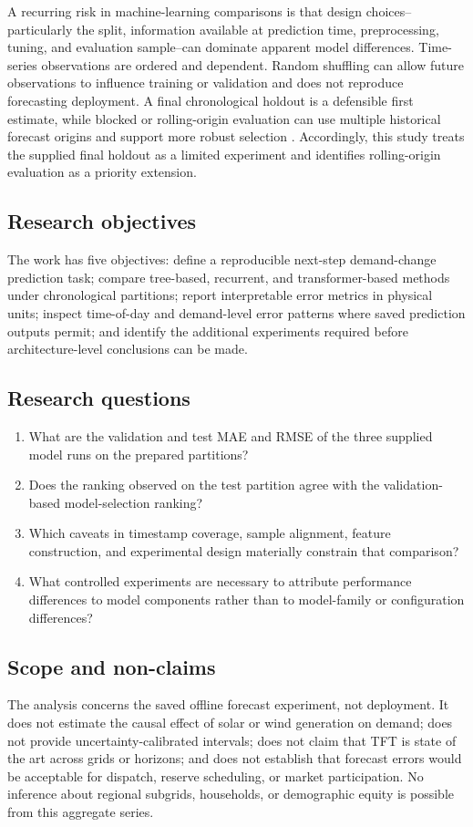 \documentclass[12pt,a4paper]{article}
\begin{document}
A recurring risk in machine-learning comparisons is that design choices--particularly the split, information available at prediction time, preprocessing, tuning, and evaluation sample--can dominate apparent model differences. Time-series observations are ordered and dependent. Random shuffling can allow future observations to influence training or validation and does not reproduce forecasting deployment. A final chronological holdout is a defensible first estimate, while blocked or rolling-origin evaluation can use multiple historical forecast origins and support more robust selection \cite{bergmeir2012}. Accordingly, this study treats the supplied final holdout as a limited experiment and identifies rolling-origin evaluation as a priority extension.

\subsection{Research objectives}
The work has five objectives: define a reproducible next-step demand-change prediction task; compare tree-based, recurrent, and transformer-based methods under chronological partitions; report interpretable error metrics in physical units; inspect time-of-day and demand-level error patterns where saved prediction outputs permit; and identify the additional experiments required before architecture-level conclusions can be made.

\subsection{Research questions}
\begin{enumerate}[leftmargin=*]
\item What are the validation and test MAE and RMSE of the three supplied model runs on the prepared partitions?
\item Does the ranking observed on the test partition agree with the validation-based model-selection ranking?
\item Which caveats in timestamp coverage, sample alignment, feature construction, and experimental design materially constrain that comparison?
\item What controlled experiments are necessary to attribute performance differences to model components rather than to model-family or configuration differences?
\end{enumerate}

\subsection{Scope and non-claims}
The analysis concerns the saved offline forecast experiment, not deployment. It does not estimate the causal effect of solar or wind generation on demand; does not provide uncertainty-calibrated intervals; does not claim that TFT is state of the art across grids or horizons; and does not establish that forecast errors would be acceptable for dispatch, reserve scheduling, or market participation. No inference about regional subgrids, households, or demographic equity is possible from this aggregate series.
\end{document}

